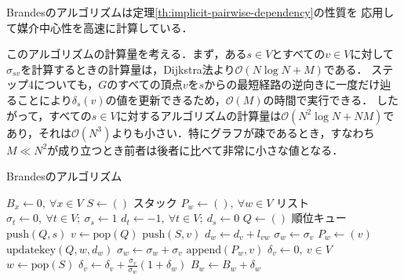 Brandesのアルゴリズムは定理\ref{th:implicit-pairwise-dependency}の性質を
応用して媒介中心性を高速に計算している．

このアルゴリズムの計算量を考える．まず，ある$s\in V$とすべての$v\in V$に対して$\sigma_{sv}$を計算するときの計算量は，Dijkstra法より$\mathcal{O}(N\log N+M)$である．
ステップ4についても，$G$のすべての頂点$v$を$s$からの最短経路の逆向きに一度だけ辿ることにより$\delta_s(v)$の値を更新できるため，$\mathcal{O}(M)$の時間で実行できる\cite{Brandes2001}．
したがって，すべての$s\in V$に対するアルゴリズムの計算量は$\mathcal{O}(N^2\log N+NM)$であり，それは$\mathcal{O}(N^3)$よりも小さい．特にグラフが疎であるとき，すなわち$M \ll N^2$が成り立つとき前者は後者に比べて非常に小さな値となる．

\begin{algorithm}[H]
  \caption{Brandesのアルゴリズム}
  \label{algo:brandes}
  \begin{multicols}{2}
    \begin{algorithmic}[1]
      \State $B_x\gets 0,\:\forall x\in V$
      \State $S\gets()$ \Comment スタック
      \State $P_w\gets (),\:\forall w\in V$ \Comment リスト
      \State $\sigma_t\gets 0,\:\forall t\in V;\:\sigma_s\gets 1$
      \State $d_t\gets -1,\:\forall t\in V;\:d_s\gets 0$
      \State $Q\gets ()$ \Comment 順位キュー
      \State $\mathrm{push}(Q, s)$
      \State $v\gets\mathrm{pop}(Q)$
      \State $\mathrm{push}(S, v)$
      \State $d_w\gets d_v+l_{vw}$
      \State $\sigma_w\gets\sigma_v$
      \State $P_w\gets(v)$
      \State $\mathrm{updatekey}(Q, w, d_w)$
      \EndIf
      \State $\sigma_w\gets\sigma_w+\sigma_v$
      \State $\mathrm{append}(P_w, v)$
      \EndIf
      \EndFor
      \EndWhile
      \State $\delta_v\gets 0,\:v\in V$
      \State $w\gets\mathrm{pop}(S)$
      \State $\delta_v\gets\delta_v+\frac{\sigma_v}{\sigma_w}(1+\delta_w)$
      \EndFor
      \State $B_w\gets B_w+\delta_w$
      \EndIf
      \EndWhile
      \EndFor
      \EndProcedure
    \end{algorithmic}
  \end{multicols}
\end{algorithm}

